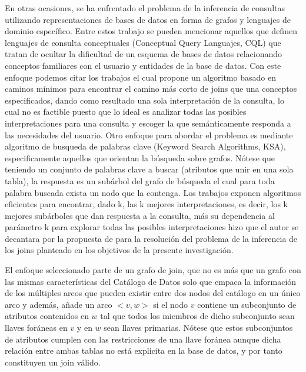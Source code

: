 En otras ocasiones, se ha enfrentado el problema de la inferencia de consultas utilizando representaciones
de bases de datos en forma de grafos y lenguajes 
de dominio espec\'ifico. Entre estos trabajo se pueden mencionar aquellos que definen lenguajes de consulta 
conceptuales (Conceptual Query Languajes, CQL) que tratan de ocultar la dificultad de un esquema de bases de 
datos relacionando conceptos familiares con el usuario y entidades de la base de datos. Con este enfoque 
podemos citar los trabajos \cite{owei2001enriching} el cual propone
un algoritmo basado en caminos m\'inimos para encontrar el camino m\'as corto de joins que una conceptos 
especificados, dando como resultado una sola interpretaci\'on de la consulta, lo cual no es factible 
puesto que lo ideal es analizar todas las posibles interpretaciones para una consulta y escoger la 
que sem\'anticamente responda a las necesidades del usuario. Otro enfoque para abordar el problema 
es mediante algoritmo de busqueda de palabras clave (Keyword Search Algorithms, KSA), especificamente  
aquellos que orientan la b\'usqueda sobre grafos. N\'otese que teniendo un conjunto de palabras clave 
a buscar (atributos que unir en una sola tabla), la respuesta es un sub\'arbol del grafo de b\'usqueda 
el cual para toda palabra buscada exista un nodo que la contenga. Los trabajos 
\cite{kimelfeld2006finding,hristidis2003efficient,he2007blinks} exponen algoritmos eficientes para 
encontrar, dado k, las k mejores interpretaciones, es decir, los k mejores sub\'arboles que dan respuesta 
a la consulta, m\'as su dependencia al par\'ametro k para explorar todas las posibles interpretaciones 
hizo que el autor se decantara por la propuesta de \cite{mason2005autojoin} para la resoluci\'on 
del problema de la inferencia de los joins planteado en los objetivos de la presente investigaci\'on.

El enfoque seleccionado parte de un grafo de join, que no es m\'as que un grafo con las mismas caracter\'isticas 
del Cat\'alogo de Datos solo que empaca la información de los m\'ultiples arcos que pueden existir entre 
dos nodos del cat\'alogo en un \'unico arco y adem\'as, añade un arco $<v, w>$ si el nodo $v$ contiene un subconjunto 
de atributos contenidos en $w$ tal que todos los miembros de dicho subconjunto sean llaves for\'aneas en $v$
y en $w$ sean llaves primarias. N\'otese que estos subconjuntos de atributos cumplen con las restricciones 
de una llave for\'anea aunque dicha relaci\'on entre ambas tablas no est\'a explicita en la base de datos, 
y por tanto constituyen un join v\'alido.

